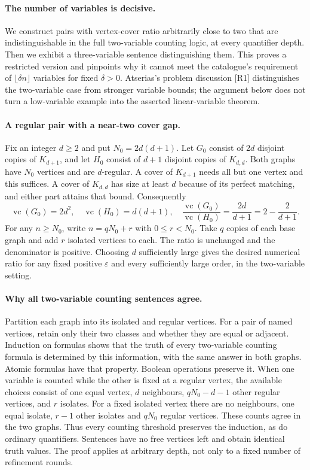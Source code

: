 \documentclass[11pt,a4paper]{article}
\begin{document}
\paragraph{The number of variables is decisive.}
We construct pairs with vertex-cover ratio arbitrarily
close to two that are indistinguishable in the full
two-variable counting logic, at every quantifier depth.
Then we exhibit a three-variable sentence distinguishing
them. This proves a restricted version and pinpoints
why it cannot meet the catalogue's requirement of
$\lfloor\delta n\rfloor$ variables for fixed $\delta>0$.
Atserias's problem discussion [R1] distinguishes the
two-variable case from stronger variable bounds; the
argument below does not turn a low-variable example
into the asserted linear-variable theorem.

\paragraph{A regular pair with a near-two cover gap.}
Fix an integer $d\ge2$ and put $N_0=2d(d+1)$.
Let $G_0$ consist of $2d$ disjoint copies of $K_{d+1}$,
and let $H_0$ consist of $d+1$ disjoint copies of
$K_{d,d}$. Both graphs have $N_0$ vertices and are
$d$-regular. A cover of $K_{d+1}$ needs all but one
vertex and this suffices. A cover of $K_{d,d}$ has
size at least $d$ because of its perfect matching,
and either part attains that bound. Consequently
\[
 \operatorname{vc}(G_0)=2d^2,\quad
 \operatorname{vc}(H_0)=d(d+1),\quad
 \frac{\operatorname{vc}(G_0)}{\operatorname{vc}(H_0)}
       =\frac{2d}{d+1}=2-\frac2{d+1}.
\]
For any $n\ge N_0$, write $n=qN_0+r$ with
$0\le r<N_0$. Take $q$ copies of each base graph
and add $r$ isolated vertices to each. The ratio is
unchanged and the denominator is positive. Choosing
$d$ sufficiently large gives the desired numerical
ratio for any fixed positive $\varepsilon$ and every
sufficiently large order, in the two-variable setting.

\paragraph{Why all two-variable counting sentences agree.}
Partition each graph into its isolated and regular
vertices. For a pair of named vertices, retain only
their two classes and whether they are equal or adjacent.
Induction on formulas shows that the truth of every
two-variable counting formula is determined by this
information, with the same answer in both graphs.
Atomic formulas have that property. Boolean operations
preserve it. When one variable is counted while the
other is fixed at a regular vertex, the available
choices consist of one equal vertex, $d$ neighbours,
$qN_0-d-1$ other regular vertices, and $r$ isolates.
For a fixed isolated vertex there are no neighbours,
one equal isolate, $r-1$ other isolates and $qN_0$
regular vertices. These counts agree in the two graphs.
Thus every counting threshold preserves the induction,
as do ordinary quantifiers. Sentences have no free
vertices left and obtain identical truth values.
The proof applies at arbitrary depth, not only to a
fixed number of refinement rounds.
\end{document}
